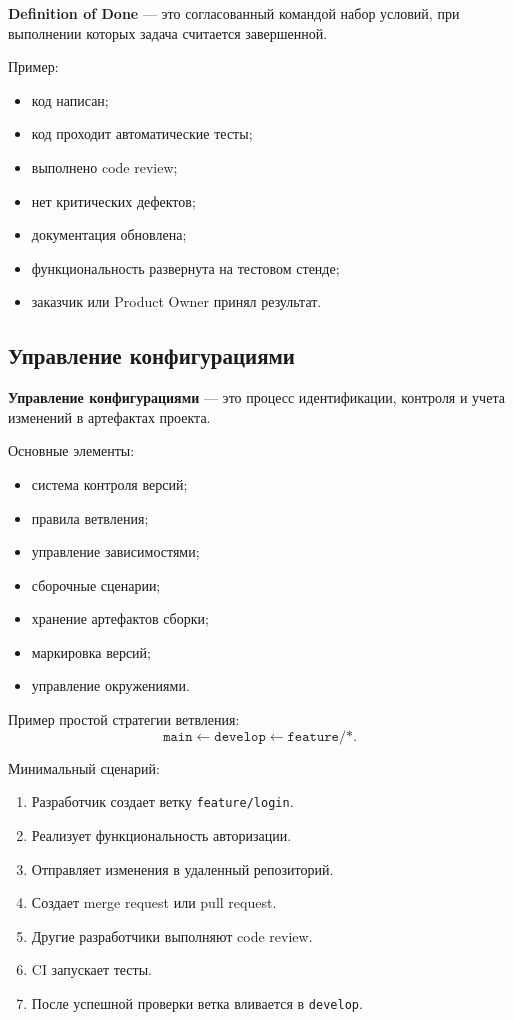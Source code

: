 \documentclass[12pt,a4paper]{article}
\begin{document}
\textbf{Definition of Done} --- это согласованный командой набор условий, при выполнении которых задача считается завершенной.

Пример:
\begin{itemize}
    \item код написан;
    \item код проходит автоматические тесты;
    \item выполнено code review;
    \item нет критических дефектов;
    \item документация обновлена;
    \item функциональность развернута на тестовом стенде;
    \item заказчик или Product Owner принял результат.
\end{itemize}

\subsection{Управление конфигурациями}

\textbf{Управление конфигурациями} --- это процесс идентификации, контроля и учета изменений в артефактах проекта.

Основные элементы:
\begin{itemize}
    \item система контроля версий;
    \item правила ветвления;
    \item управление зависимостями;
    \item сборочные сценарии;
    \item хранение артефактов сборки;
    \item маркировка версий;
    \item управление окружениями.
\end{itemize}

Пример простой стратегии ветвления:
\[
\texttt{main} \leftarrow \texttt{develop} \leftarrow \texttt{feature/*}.
\]

Минимальный сценарий:
\begin{enumerate}
    \item Разработчик создает ветку \texttt{feature/login}.
    \item Реализует функциональность авторизации.
    \item Отправляет изменения в удаленный репозиторий.
    \item Создает merge request или pull request.
    \item Другие разработчики выполняют code review.
    \item CI запускает тесты.
    \item После успешной проверки ветка вливается в \texttt{develop}.
\end{enumerate}
\end{document}
